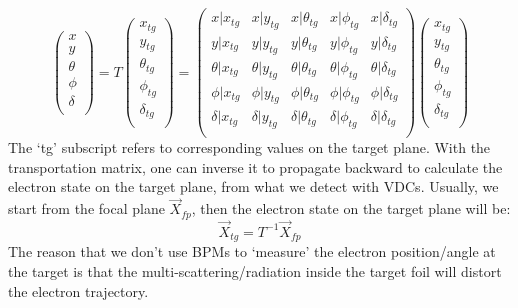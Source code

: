 \begin{equation}
    \begin{pmatrix}
	x   \\
	y   \\
	\theta	\\
	\phi	\\
	\delta	\\
    \end{pmatrix}
    =
    T
    \begin{pmatrix}
	x_{tg}   \\
	y_{tg}   \\
	\theta_{tg}	\\
	\phi_{tg}	\\
	\delta_{tg}	\\
    \end{pmatrix}
    =
    \begin{pmatrix}
	x|x_{tg} & x|y_{tg}   & x|\theta_{tg}	& x|\phi_{tg}    & x|\delta_{tg}    \\
	y|x_{tg} & y|y_{tg}   & y|\theta_{tg}	& y|\phi_{tg}    & y|\delta_{tg}    \\
	\theta|x_{tg} & \theta|y_{tg}   & \theta|\theta_{tg}	& \theta|\phi_{tg}    & \theta|\delta_{tg}    \\
	\phi|x_{tg} & \phi|y_{tg}   & \phi|\theta_{tg}	& \phi|\phi_{tg}    & \phi|\delta_{tg}    \\
	\delta|x_{tg} & \delta|y_{tg}   & \delta|\theta_{tg}	& \delta|\phi_{tg}    & \delta|\delta_{tg}    \\
    \end{pmatrix}
    \begin{pmatrix}
	x_{tg}   \\
	y_{tg}   \\
	\theta_{tg}	\\
	\phi_{tg}	\\
	\delta_{tg}	\\
    \end{pmatrix}
\end{equation}
The `tg' subscript refers to corresponding values on the target plane. 
With the transportation matrix, one can inverse it to propagate backward 
to calculate the electron state on the target plane, 
from what we detect with VDCs. Usually, we start from the focal plane $\vec{X}_{fp}$, 
then the electron state on the target plane will be: 
\begin{equation}
    \vec{X}_{tg} = T^{-1} \vec{X}_{fp}
    \label{eq:reconstruction}
\end{equation}
The reason that we don't use BPMs to `measure' the electron position/angle at 
the target is that the multi-scattering/radiation inside the target foil will 
distort the electron trajectory. 

